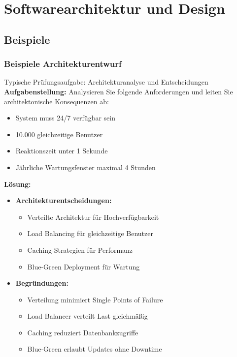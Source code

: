 \section{Softwarearchitektur und Design}

\subsection{Beispiele}

\subsubsection{Beispiele Architekturentwurf}

\begin{example2}{Typische Prüfungsaufgabe: Architekturanalyse und Entscheidungen}\\
\textbf{Aufgabenstellung:}
Analysieren Sie folgende Anforderungen und leiten Sie architektonische Konsequenzen ab:
\begin{itemize}
    \item System muss 24/7 verfügbar sein
    \item 10.000 gleichzeitige Benutzer
    \item Reaktionszeit unter 1 Sekunde
    \item Jährliche Wartungsfenster maximal 4 Stunden
\end{itemize}

\textbf{Lösung:}
\begin{itemize}
    \item \textbf{Architekturentscheidungen:}
    \begin{itemize}
        \item Verteilte Architektur für Hochverfügbarkeit
        \item Load Balancing für gleichzeitige Benutzer
        \item Caching-Strategien für Performanz
        \item Blue-Green Deployment für Wartung
    \end{itemize}
    
    \item \textbf{Begründungen:}
    \begin{itemize}
        \item Verteilung minimiert Single Points of Failure
        \item Load Balancer verteilt Last gleichmäßig
        \item Caching reduziert Datenbankzugriffe
        \item Blue-Green erlaubt Updates ohne Downtime
    \end{itemize}
\end{itemize}
\end{example2}


